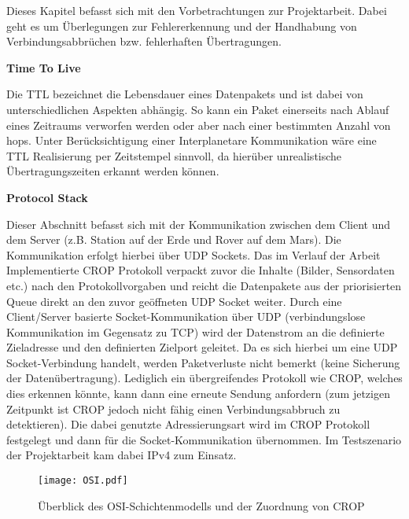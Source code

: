 

Dieses Kapitel befasst sich mit den Vorbetrachtungen zur Projektarbeit. Dabei
geht es um {\"U}berlegungen zur Fehlererkennung und der Handhabung von
Verbindungsabbr{\"u}chen bzw. fehlerhaften {\"U}bertragungen.

\textbf{Time To Live}

Die TTL bezeichnet die Lebensdauer eines Datenpakets und ist dabei von
unterschiedlichen Aspekten abh{\"a}ngig. So kann ein Paket einerseits nach
Ablauf eines Zeitraums verworfen werden oder aber nach einer bestimmten Anzahl
von hops.  Unter Ber{\"u}cksichtigung einer Interplanetare Kommunikation
w{\"a}re eine TTL Realisierung per Zeitstempel sinnvoll, da hier{\"u}ber
unrealistische {\"U}bertragungszeiten erkannt werden k{\"o}nnen.

\textbf{Protocol Stack}

Dieser Abschnitt befasst sich mit der Kommunikation zwischen dem Client
und dem Server (z.B. Station auf der Erde und Rover auf dem Mars). Die
Kommunikation erfolgt hierbei {\"u}ber UDP Sockets. Das im Verlauf der Arbeit
Implementierte CROP Protokoll verpackt zuvor die Inhalte (Bilder, Sensordaten etc.) 
nach den Protokollvorgaben und reicht die Datenpakete aus der priorisierten Queue 
direkt an den zuvor ge{\"o}ffneten UDP Socket weiter. Durch eine Client/Server
basierte Socket-Kommunikation {\"u}ber UDP 
(verbindungslose Kommunikation im Gegensatz zu TCP) wird der Datenstrom an die
definierte Zieladresse und den definierten Zielport geleitet. Da es sich
hierbei um eine UDP Socket-Verbindung handelt, werden Paketverluste nicht
bemerkt (keine Sicherung der Daten{\"u}bertragung). Lediglich ein {\"u}bergreifendes
Protokoll wie CROP, welches dies erkennen k{\"o}nnte, kann dann eine erneute
Sendung anfordern (zum jetzigen Zeitpunkt ist CROP jedoch nicht f{\"a}hig einen
Verbindungsabbruch zu detektieren). Die dabei genutzte Adressierungsart wird im
CROP Protokoll festgelegt und dann f{\"u}r die Socket-Kommunikation {\"u}bernommen. Im
Testszenario der Projektarbeit kam dabei IPv4 zum Einsatz. 

\begin{figure}[H]
\centering
\texttt{[image: OSI.pdf]}
\caption{{\"U}berblick des OSI-Schichtenmodells und der Zuordnung von CROP}
\label{fig:OSI}
\end{figure}

